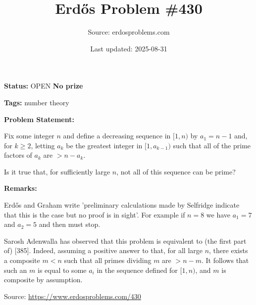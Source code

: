\documentclass{article}
\title{Erd\H{o}s Problem \#430}
\date{Last updated: 2025-08-31}
\author{Source: erdosproblems.com}
\begin{document}
\maketitle

\noindent\textbf{Status:} OPEN \quad \textbf{No prize}

\noindent\textbf{Tags:} number theory

\medskip
\noindent\textbf{Problem Statement:}

Fix some integer $n$ and define a decreasing sequence in $[1,n)$ by $a_1=n-1$ and, for $k\geq 2$, letting $a_k$ be the greatest integer in $[1,a_{k-1})$ such that all of the prime factors of $a_k$ are $>n-a_k$.

Is it true that, for sufficiently large $n$, not all of this sequence can be prime?

\bigskip
\noindent\textbf{Remarks:}

Erd\H{o}s and Graham write 'preliminary calculations made by Selfridge indicate that this is the case but no proof is in sight'. For example if $n=8$ we have $a_1=7$ and $a_2=5$ and then must stop.

Sarosh Adenwalla has observed that this problem is equivalent to (the first part of) [385]. Indeed, assuming a positive answer to that, for all large $n$, there exists a composite $m<n$ such that all primes dividing $m$ are $>n-m$. It follows that such an $m$ is equal to some $a_i$ in the sequence defined for $[1,n)$, and $m$ is composite by assumption.

\bigskip
\noindent\small{Source: \url{https://www.erdosproblems.com/430}}
\end{document}

